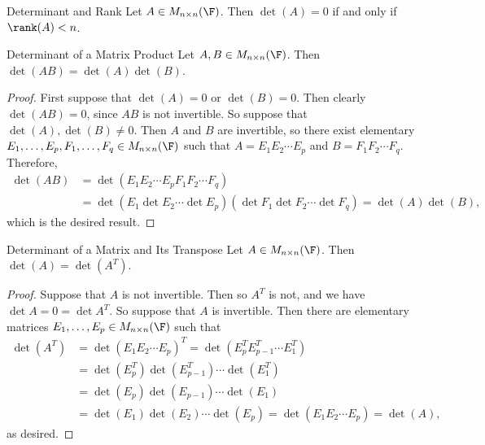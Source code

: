\documentclass[linearalgebra]{subfiles}
\begin{document}
    \begin{cor}{Determinant and Rank}
        Let $A\in M_{n\times n}(\F)$. Then $\det(A) = 0$ if and only if $\rank(A)<n$.
    \end{cor}	

    \begin{prop}{Determinant of a Matrix Product}
        Let $A, B\in M_{n\times n}(\F)$. Then $\det(AB) = \det(A)\det(B)$.
    \end{prop}

    \begin{proof}
        First suppose that $\det(A) = 0$ or $\det(B) = 0$. Then clearly $\det(AB) = 0$, since $AB$ is not invertible. So suppose that $\det(A), \det(B)\neq 0$. Then $A$ and $B$ are invertible, so there exist elementary $E_1, \ldots, E_p, F_1, \ldots, F_q\in M_{n\times n}(\F)$ such that $A = E_1E_2\cdots E_p$ and $B = F_1F_2 \cdots F_q$. Therefore,
        \begin{align*}
            \det (AB) & = \det \left( E_1E_2\cdots E_pF_1F_2\cdots F_q \right) \\
                      & = \det \left( E_1\det E_2\cdots \det E_p \right) \left( \det F_1\det F_2\cdots \det F_q \right) = \det(A)\det(B),
        \end{align*} 
        which is the desired result.
    \end{proof}

    \begin{prop}{Determinant of a Matrix and Its Transpose}
        Let $A\in M_{n\times n}(\F)$. Then $\det(A) = \det \left( A^T \right)$.
    \end{prop}

    \begin{proof}
        Suppose that $A$ is not invertible. Then so $A^T$ is not, and we have $\det A = 0 = \det A^T$. So suppose that $A$ is invertible. Then there are elementary matrices $E_1, \ldots, E_p\in M_{n\times n}(\F)$ such that
        \begin{align*}
           \det(A^T) & = \det \left( E_1E_2\cdots E_p \right)^T = \det \left( E_p^TE_{p-1}^T\cdots E_1^T \right) \\
                     & = \det \left( E_p^T \right) \det \left(E_{p-1}^T\right) \cdots \det \left( E_1^T \right) \\
                     & = \det (E_p) \det (E_{p-1}) \cdots \det (E_1) \\
                     & = \det(E_1) \det(E_2) \cdots \det(E_p) = \det \left( E_1E_2\cdots E_p \right) = \det (A),
        \end{align*} 
        as desired.
    \end{proof}
\end{document}
